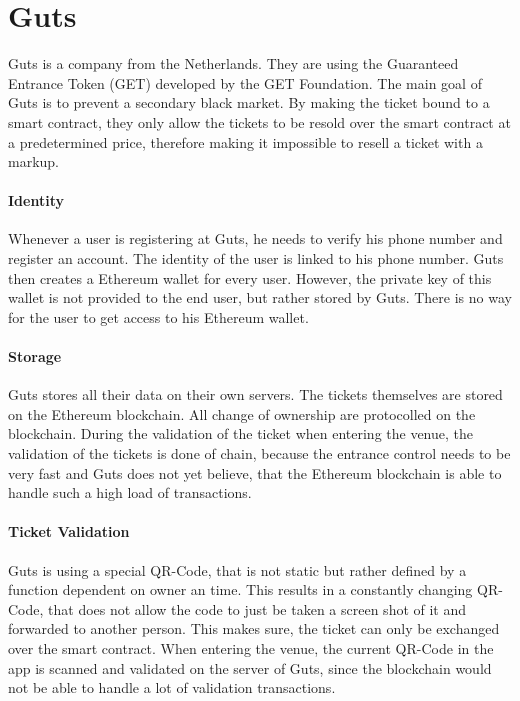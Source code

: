 
\section{Guts}
Guts \cite{GET_PROTOCOL} is a company from the Netherlands. They are using the Guaranteed Entrance Token (GET) developed by the GET Foundation. The main goal of Guts is to prevent a secondary black market. By making the ticket bound to a smart contract, they only allow the tickets to be resold over the smart contract at a predetermined price, therefore making it impossible to resell a ticket with a markup.

\paragraph{Identity}
Whenever a user is registering at Guts, he needs to verify his phone number and register an account. The identity of the user is linked to his phone number. Guts then creates a Ethereum wallet for every user. However, the private key of this wallet is not provided to the end user, but rather stored by Guts. There is no way for the user to get access to his Ethereum wallet.


\paragraph{Storage}
Guts stores all their data on their own servers. The tickets themselves are stored on the Ethereum blockchain. All change of ownership are protocolled on the blockchain. During the validation of the ticket when entering the venue, the validation of the tickets is done of chain, because the entrance control needs to be very fast and Guts does not yet believe, that the Ethereum blockchain is able to handle such a high load of transactions.

\paragraph{Ticket Validation}
Guts is using a special QR-Code, that is not static but rather defined by a function dependent on owner an time. This results in a constantly changing QR-Code, that does not allow the code to just be taken a screen shot of it and forwarded to another person. This makes sure, the ticket can only be exchanged over the smart contract. When entering the venue, the current QR-Code in the app is scanned and validated on the server of Guts, since the blockchain would not be able to handle a lot of validation transactions.


